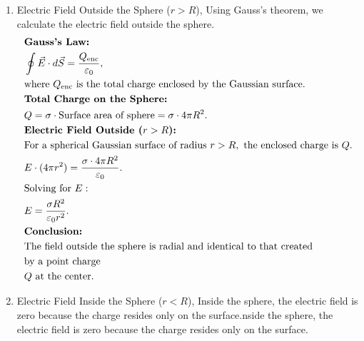 \documentclass[12pt]{article}
\begin{document}
\begin{correctionbox}
	\begin{enumerate}
		\item Electric Field Outside the Sphere ($ r > R $),
		      Using Gauss's theorem, we calculate the electric field outside the sphere.
		      \begin{align*}
			       & \textbf{Gauss's Law:}                                                                        \\
			       & \oint \vec{E} \cdot d\vec{S} = \frac{Q_{\text{enc}}}{\varepsilon_0},                         \\
			       & \text{where } Q_{\text{enc}} \text{ is the total charge enclosed by the Gaussian surface.}
			      \\
			       & \textbf{Total Charge on the Sphere:}                                                         \\
			       & Q = \sigma \cdot \text{Surface area of sphere} = \sigma \cdot 4 \pi R^2.
			      \\
			       & \textbf{Electric Field Outside ($ r > R $):}                                                 \\
			       & \text{For a spherical Gaussian surface of radius } r > R, \text{ the enclosed charge is } Q. \\
			       & E \cdot (4 \pi r^2) = \frac{\sigma \cdot 4 \pi R^2}{\varepsilon_0}.
			      \\
			       & \text{Solving for } E:                                                                       \\
			       & E = \frac{\sigma R^2}{\varepsilon_0 r^2}.
			      \\
			       & \textbf{Conclusion:}                                                                         \\
			       & \text{The field outside the sphere is radial and identical to that created }                 \\
			       & \text{by a point charge}                                                                     \\
			       & Q \text{ at the center.}
		      \end{align*}
		\item Electric Field Inside the Sphere ($ r < R $),
		      Inside the sphere, the electric field is zero because the charge resides only on the surface.nside the sphere, the electric field is zero because the charge resides only on the surface.

\end{enumerate}
\end{correctionbox}
\end{document}
